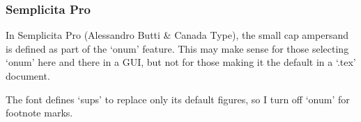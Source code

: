 \documentclass{beamer}
\begin{document}
\begin{frame}
  \frametitle{Semplicita Pro}

  In Semplicita Pro (Alessandro Butti \& Canada Type), the small cap
  ampersand is defined as part of the ‘onum’ feature. This may make
  sense for those selecting ‘onum’ here and there in a GUI, but not
  for those making it the default in a ‘.tex’ document.

  The font defines ‘sups’ to replace only its default figures, so I
  turn off ‘onum’ for footnote marks.
\end{frame}
\end{document}
